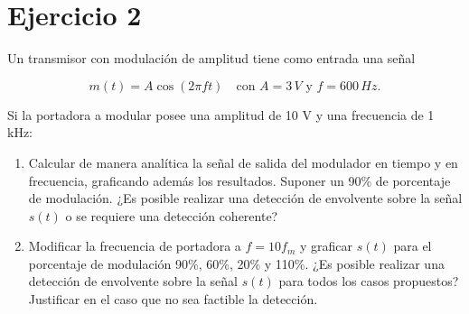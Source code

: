 \section{Ejercicio 2}

Un transmisor con modulación de amplitud tiene como entrada una señal

\[
m(t) = A \cos(2 \pi f t) \quad \text{con } A = 3\,V \text{ y } f = 600\,Hz.
\]

Si la portadora a modular posee una amplitud de 10 V y una frecuencia de 1 kHz:

\begin{enumerate}[label=\alph*)]
    \item Calcular de manera analítica la señal de salida del modulador en tiempo y en frecuencia, graficando además los resultados. Suponer un 90\% de porcentaje de modulación. ¿Es posible realizar una detección de envolvente sobre la señal $s(t)$ o se requiere una detección coherente?
    \item Modificar la frecuencia de portadora a $f = 10 f_m$ y graficar $s(t)$ para el porcentaje de modulación 90\%, 60\%, 20\% y 110\%. ¿Es posible realizar una detección de envolvente sobre la señal $s(t)$ para todos los casos propuestos? Justificar en el caso que no sea factible la detección.
\end{enumerate}
